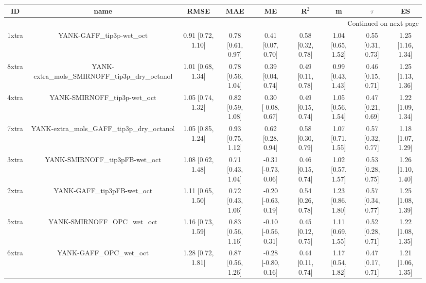 \documentclass{article}
\begin{document}
\begin{center}
\scriptsize
\begin{longtable}{|ccccccccc|}
\toprule
    ID &                                             name &               RMSE &                MAE &                   ME &              R$^2$ &                  m &             $\tau$ &                 ES \\
\midrule
\endhead
\midrule
\multicolumn{9}{r}{{Continued on next page}} \\
\midrule
\endfoot

\bottomrule
\endlastfoot
 1xtra &                        YANK-GAFF\_tip3p-wet\_oct &  0.91 [0.72, 1.10] &  0.78 [0.61, 0.97] &    0.41 [0.07, 0.70] &  0.58 [0.32, 0.78] &  1.04 [0.65, 1.52] &  0.55 [0.31, 0.73] &  1.25 [1.16, 1.34] \\
 8xtra &  YANK-extra\_mols\_SMIRNOFF\_tip3p\_dry\_octanol &  1.01 [0.68, 1.34] &  0.78 [0.56, 1.04] &    0.39 [0.04, 0.74] &  0.49 [0.11, 0.78] &  0.99 [0.43, 1.43] &  0.46 [0.15, 0.71] &  1.25 [1.13, 1.36] \\
 4xtra &                    YANK-SMIRNOFF\_tip3p-wet\_oct &  1.05 [0.74, 1.32] &  0.82 [0.59, 1.08] &   0.30 [-0.08, 0.67] &  0.49 [0.15, 0.74] &  1.05 [0.56, 1.54] &  0.47 [0.21, 0.69] &  1.22 [1.09, 1.34] \\
 7xtra &      YANK-extra\_mols\_GAFF\_tip3p\_dry\_octanol &  1.05 [0.85, 1.24] &  0.93 [0.75, 1.12] &    0.62 [0.28, 0.94] &  0.58 [0.30, 0.79] &  1.07 [0.71, 1.55] &  0.57 [0.32, 0.77] &  1.18 [1.07, 1.29] \\
 3xtra &                  YANK-SMIRNOFF\_tip3pFB-wet\_oct &  1.08 [0.62, 1.48] &  0.71 [0.43, 1.04] &  -0.31 [-0.73, 0.06] &  0.46 [0.15, 0.74] &  1.02 [0.57, 1.57] &  0.53 [0.28, 0.75] &  1.26 [1.10, 1.40] \\
 2xtra &                      YANK-GAFF\_tip3pFB-wet\_oct &  1.11 [0.65, 1.50] &  0.72 [0.43, 1.06] &  -0.20 [-0.63, 0.19] &  0.54 [0.26, 0.78] &  1.23 [0.86, 1.80] &  0.57 [0.34, 0.77] &  1.25 [1.08, 1.39] \\
 5xtra &                     YANK-SMIRNOFF\_OPC\_wet\_oct &  1.16 [0.73, 1.59] &  0.83 [0.56, 1.16] &  -0.10 [-0.56, 0.31] &  0.45 [0.12, 0.75] &  1.11 [0.69, 1.55] &  0.52 [0.28, 0.71] &  1.22 [1.08, 1.35] \\
 6xtra &                         YANK-GAFF\_OPC\_wet\_oct &  1.28 [0.72, 1.81] &  0.87 [0.56, 1.26] &  -0.28 [-0.80, 0.16] &  0.44 [0.11, 0.74] &  1.17 [0.54, 1.82] &  0.47 [0.17, 0.71] &  1.21 [1.06, 1.35] \\
\end{longtable}
\end{center}
\end{document}
